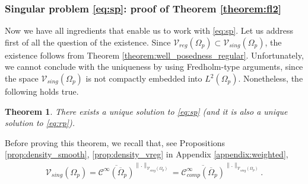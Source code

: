 \documentclass[report]{elsarticle}
\newtheorem{theorem}{Theorem}[section]
\numberwithin{theorem}{section}
\begin{document}
\subsubsection{Singular problem \eqref{eq:sp}: proof of Theorem \ref{theorem:fl2}}
Now we have all ingredients that enable us to work with \eqref{eq:sp}. Let us address first of all the question of the existence. Since $\mathcal{V}_{reg}(\Omega_p)\subset \mathcal{V}_{sing}(\Omega_p)$, the existence follows from Theorem \ref{theorem:well_posedness_regular}.  Unfortunately, we cannot conclude with the uniqueness by using Fredholm-type arguments, since the space  $\mathcal{V}_{sing}(\Omega_p)$ is not compactly embedded into $L^2(\Omega_p)$. 
Nonetheless, the following holds true. 
\begin{theorem}
	\label{thm:sp_wp}
	There exists a unique solution to \eqref{eq:sp} (and it is also a unique solution to \eqref{eq:rp}).
\end{theorem}
Before proving this theorem, we recall that, see Propositions \ref{prop:density_smooth}, \ref{prop:density_vreg} in Appendix \ref{appendix:weighted},  
\begin{align}
	\label{eq:vsing_density}
	\mathcal{V}_{sing}(\Omega_p)=\overline{\mathcal{C}^{\infty}(\overline{\Omega}_p)}^{\|.\|_{\mathcal{V}_{sing}(\Omega_p)}}=\overline{\mathcal{C}^{\infty}_{comp}(\overline{\Omega}_p)}^{\|.\|_{\mathcal{V}_{sing}(\Omega_p)}}.
\end{align}
\end{document}
